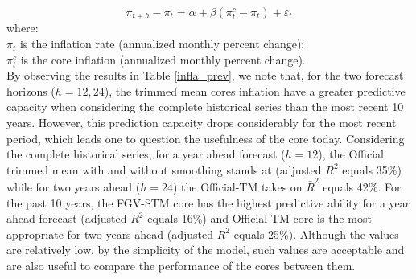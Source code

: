 \documentclass[10pt]{article}
\begin{document}
\begin{equation}
\label{equacao_prev}
\pi_{t+h} - \pi_{t} = \alpha + \beta (\pi_{t}^{c} - \pi_{t} ) + \varepsilon_t 
\end{equation}
\noindent
where:\\
$\pi_t$ is the inflation rate (annualized monthly percent change);\\
$\pi_t^{c}$ is the core inflation (annualized monthly percent change).\\


By observing the results in Table \ref{infla_prev}, we note that, for the two forecast horizons ($h=12,24$), the trimmed mean cores inflation have a greater predictive capacity when considering the complete historical series than the most recent 10 years. However, this prediction capacity drops considerably for the most recent period, which leads one to question the usefulness of the core today. Considering the complete historical series, for a year ahead forecast  ($h=12$), the Official trimmed mean with and without smoothing stands at (adjusted $R^2$ equals 35\%) while for two years ahead ($h=24$) the Official-TM takes on $\bar{R}^2$ equals 42\%. For the past 10 years, the FGV-STM core has the highest predictive ability for a year ahead forecast (adjusted $R^2$ equals 16\%) and Official-TM core is the most appropriate for two years ahead (adjusted $R^2$ equals 25\%). Although the values are relatively low, by the simplicity of the model, such values are acceptable and are also useful to compare the performance of the cores between them.

\end{document}
